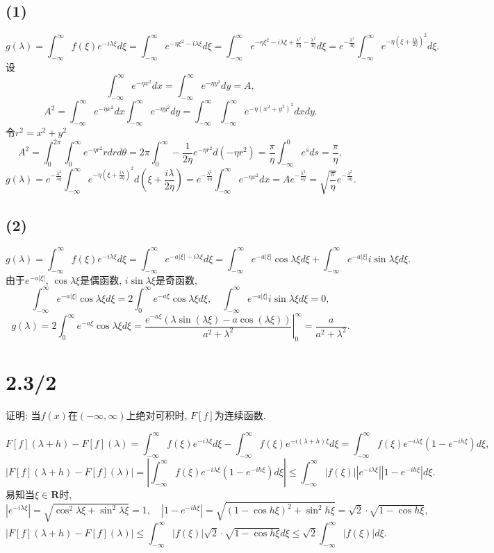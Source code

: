 \documentclass[11pt,a4paper]{article}
\begin{document}
\subsection*{(1)}
$$g(\lambda)=\int_{-\infty}^{\infty}f(\xi)e^{-i\lambda\xi}d\xi=\int_{-\infty}^{\infty}e^{-\eta\xi^2-i\lambda\xi}d\xi=\int_{-\infty}^{\infty}e^{-\eta\xi^2-i\lambda\xi+\frac{\lambda^2}{4\eta}-\frac{\lambda^2}{4\eta}}d\xi=e^{-\frac{\lambda^2}{4\eta}}\int_{-\infty}^{\infty}e^{-\eta\left(\xi+\frac{i\lambda}{2\eta}\right)^2}d\xi.$$
设$$\int_{-\infty}^\infty e^{-\eta x^2}dx=\int_{-\infty}^\infty e^{-\eta y^2}dy=A,$$
$$A^2=\int_{-\infty}^\infty e^{-\eta x^2}dx\int_{-\infty}^\infty e^{-\eta y^2}dy=\int_{-\infty}^\infty\int_{-\infty}^\infty e^{-\eta(x^2+y^2)^2}dxdy.$$
令$r^2=x^2+y^2$
$$A^2=\int_0^{2\pi}\int_0^\infty e^{-\eta r^2}rdrd\theta=2\pi\int_0^\infty-\frac{1}{2\eta}e^{-\eta r^2}d(-\eta r^2)=\frac{\pi}{\eta}\int_{-\infty}^0 e^sds=\frac{\pi}{\eta},$$
$$g(\lambda)=e^{-\frac{\lambda^2}{4\eta}}\int_{-\infty}^{\infty}e^{-\eta\left(\xi+\frac{i\lambda}{2\eta}\right)^2}d\left(\xi+\frac{i\lambda}{2\eta}\right)=e^{-\frac{\lambda^2}{4\eta}}\int_{-\infty}^{\infty}e^{-\eta x^2}dx=Ae^{-\frac{\lambda^2}{4\eta}}=\sqrt{\frac{\pi}{\eta}}e^{-\frac{\lambda^2}{4\eta}}.$$

\subsection*{(2)}
$$g(\lambda)=\int_{-\infty}^{\infty}f(\xi)e^{-i\lambda\xi}d\xi=\int_{-\infty}^{\infty}e^{-a|\xi|-i\lambda\xi}d\xi=\int_{-\infty}^{\infty}e^{-a|\xi|}\cos\lambda\xi d\xi+\int_{-\infty}^{\infty}e^{-a|\xi|}i\sin\lambda\xi d\xi.$$
由于$e^{-a|\xi|}$, $\cos\lambda\xi$是偶函数, $i\sin\lambda\xi$是奇函数,
$$\int_{-\infty}^{\infty}e^{-a|\xi|}\cos\lambda\xi d\xi=2\int_0^\infty e^{-a\xi}\cos\lambda\xi d\xi,\quad \int_{-\infty}^{\infty}e^{-a|\xi|}i\sin\lambda\xi d\xi=0,$$
$$g(\lambda)=2\int_0^\infty e^{-a\xi}\cos\lambda\xi d\xi=\left.\frac{e^{-a \xi } (\lambda  \sin (\lambda  \xi )-a \cos (\lambda  \xi ))}{a^2+\lambda ^2}\right|_0^{\infty}=\frac{a}{a^2+\lambda^2}.$$

\section{2.3/2}
\begin{problem}
证明: 当$f(x)$在$(-\infty,\infty)$上绝对可积时, $F[f]$为连续函数.
\end{problem}

$$F[f](\lambda+h)-F[f](\lambda)=\int_{-\infty}^{\infty}f(\xi)e^{-i\lambda\xi}d\xi-\int_{-\infty}^{\infty}f(\xi)e^{-i(\lambda+h)\xi}d\xi=\int_{-\infty}^{\infty}f(\xi)e^{-i\lambda\xi}(1-e^{-ih\xi})d\xi,$$
$$|F[f](\lambda+h)-F[f](\lambda)|=\left|\int_{-\infty}^{\infty}f(\xi)e^{-i\lambda\xi}(1-e^{-ih\xi})d\xi\right|\leqslant\int_{-\infty}^{\infty}|f(\xi)|\left|e^{-i\lambda\xi}\right|\left|1-e^{-ih\xi}\right|d\xi.$$
易知当$\xi\in\mathbf{R}$时,
$$\left|e^{-i\lambda\xi}\right|=\sqrt{\cos^2\lambda\xi+\sin^2\lambda\xi}=1,\quad \left|1-e^{-ih\xi}\right|=\sqrt{(1-\cos h\xi)^2+\sin^2h\xi}=\sqrt{2}\cdot\sqrt{1-\cos h\xi},$$
$$|F[f](\lambda+h)-F[f](\lambda)|\leqslant\int_{-\infty}^{\infty}|f(\xi)|\sqrt{2}\cdot\sqrt{1-\cos h\xi}d\xi\leqslant\sqrt{2}\int_{-\infty}^{\infty}|f(\xi)|d\xi.$$
\end{document}
